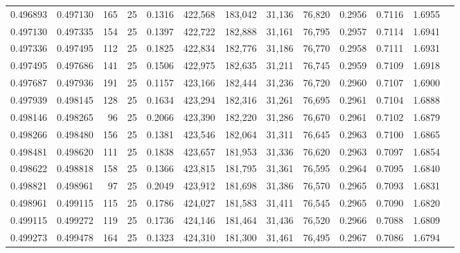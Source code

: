 \begin{tabular}{rrrrrrrrrrrrr}
0.496893 & 0.497130 &   165 &  25 &                                     0.1316 & 422,568 & 183,042 &  31,136 &  76,820 & 0.2956 & 0.7116 & 1.6955 \\
0.497130 & 0.497335 &   154 &  25 &                                     0.1397 & 422,722 & 182,888 &  31,161 &  76,795 & 0.2957 & 0.7114 & 1.6941 \\
0.497336 & 0.497495 &   112 &  25 &                                     0.1825 & 422,834 & 182,776 &  31,186 &  76,770 & 0.2958 & 0.7111 & 1.6931 \\
0.497495 & 0.497686 &   141 &  25 &                                     0.1506 & 422,975 & 182,635 &  31,211 &  76,745 & 0.2959 & 0.7109 & 1.6918 \\
0.497687 & 0.497936 &   191 &  25 &                                     0.1157 & 423,166 & 182,444 &  31,236 &  76,720 & 0.2960 & 0.7107 & 1.6900 \\
0.497939 & 0.498145 &   128 &  25 &                                     0.1634 & 423,294 & 182,316 &  31,261 &  76,695 & 0.2961 & 0.7104 & 1.6888 \\
0.498146 & 0.498265 &    96 &  25 &                                     0.2066 & 423,390 & 182,220 &  31,286 &  76,670 & 0.2961 & 0.7102 & 1.6879 \\
0.498266 & 0.498480 &   156 &  25 &                                     0.1381 & 423,546 & 182,064 &  31,311 &  76,645 & 0.2963 & 0.7100 & 1.6865 \\
0.498481 & 0.498620 &   111 &  25 &                                     0.1838 & 423,657 & 181,953 &  31,336 &  76,620 & 0.2963 & 0.7097 & 1.6854 \\
0.498622 & 0.498818 &   158 &  25 &                                     0.1366 & 423,815 & 181,795 &  31,361 &  76,595 & 0.2964 & 0.7095 & 1.6840 \\
0.498821 & 0.498961 &    97 &  25 &                                     0.2049 & 423,912 & 181,698 &  31,386 &  76,570 & 0.2965 & 0.7093 & 1.6831 \\
0.498961 & 0.499115 &   115 &  25 &                                     0.1786 & 424,027 & 181,583 &  31,411 &  76,545 & 0.2965 & 0.7090 & 1.6820 \\
0.499115 & 0.499272 &   119 &  25 &                                     0.1736 & 424,146 & 181,464 &  31,436 &  76,520 & 0.2966 & 0.7088 & 1.6809 \\
0.499273 & 0.499478 &   164 &  25 &                                     0.1323 & 424,310 & 181,300 &  31,461 &  76,495 & 0.2967 & 0.7086 & 1.6794 \\

\end{tabular}
